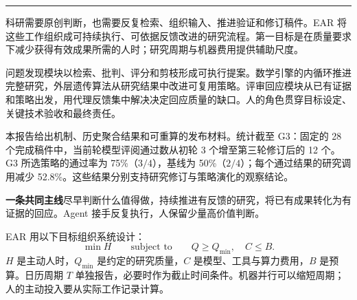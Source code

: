 \thispagestyle{cover}
\vspace*{5mm}
\par
\vspace{2mm}
\par
\vspace{3mm}
\par
\vspace{4mm}
\par
\vspace{4mm}
\ReportAuthors
\vspace{4mm}
\noindent\textcolor{teal}{\rule{\textwidth}{1.2pt}}\par
\vspace{3mm}
科研需要原创判断，也需要反复检索、组织输入、推进验证和修订稿件。EAR 将这些工作组织成可持续执行、可依据反馈改进的研究流程。第一目标是在质量要求下减少获得有效成果所需的人时；研究周期与机器费用提供辅助尺度。

问题发现模块以检索、批判、评分和剪枝形成可执行提案。数学引擎的内循环推进完整研究，外层遗传算法从研究结果中改进可复用策略。评审回应模块从已有证据和策略出发，用代理反馈集中解决决定回应质量的缺口。人的角色贯穿目标设定、关键技术验收和最终责任。

本报告给出机制、历史聚合结果和可重算的发布材料。统计截至 G3：固定的 28 个完成稿件中，当前轮模型评阅通过数从初轮 3 个增至第三轮修订后的 12 个。G3 所选策略的通过率为 75\%（$3/4$），基线为 50\%（$2/4$）；每个通过结果的研究调用减少 52.8\%。这些结果分别支持研究修订与策略演化的观察结论。
\vspace{3mm}
\begin{insight}
\textbf{一条共同主线}\quad 尽早判断什么值得做，持续推进有反馈的研究，将已有成果转化为有证据的回应。Agent 接手反复执行，人保留少量高价值判断。
\end{insight}
\vfill
{}

EAR 用以下目标组织系统设计：
\begin{equation}
\min H\qquad\text{subject to}\qquad Q\ge Q_{\min},\quad C\le B.
\label{eq:human-objective}
\end{equation}
$H$ 是主动人时，$Q_{\min}$ 是约定的研究质量，$C$ 是模型、工具与算力费用，$B$ 是预算。日历周期 $T$ 单独报告，必要时作为截止时间条件。机器并行可以缩短周期；人的主动投入要从实际工作记录计算。

